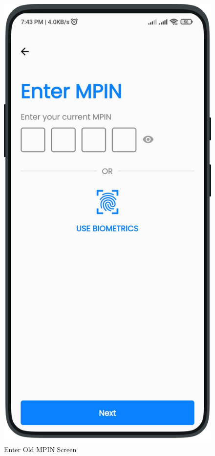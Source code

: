         \begin{multicols}{2}
            \begin{figure}[H]
            \centering
            \includegraphics[width=0.6\linewidth]{images/results/mobile/ChangeMPIN.png}
            \caption[Enter Old MPIN Screen]{Enter Old MPIN Screen}
            \label{fig:ChangeMPIN.png}
            \end{figure}
            \begin{figure}[H]
            \centering

\end{figure}
\end{multicols}
